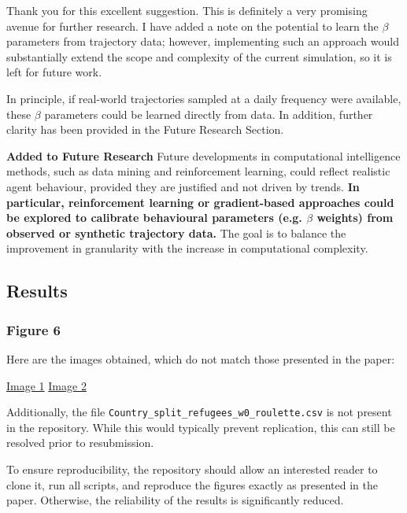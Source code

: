 \documentclass[11pt,a4paper]{article}
\begin{document}
Thank you for this excellent suggestion. This is definitely a very promising avenue for further research. I have added a note on the potential to learn the $\beta$ parameters from trajectory data; however, implementing such an approach would substantially extend the scope and complexity of the current simulation, so it is left for future work.

\vspace{0.5cm}

\begin{updatebox}

In principle, if real-world trajectories sampled at a daily frequency were available, these $\beta$ parameters could be learned directly from data.
In addition, further clarity has been provided in the Future Research Section.

\textbf{Added to Future Research} Future developments in computational intelligence methods, such as data mining and 
reinforcement learning, could reflect 
realistic agent behaviour, provided they are justified and not driven by trends. \textbf{In particular, reinforcement learning or 
gradient-based approaches could be explored to calibrate behavioural parameters (e.g. $\beta$ weights) from observed or 
synthetic trajectory data.} The goal is to balance the improvement 
in granularity with the increase in computational complexity. 
\end{updatebox}

\vspace{0.5cm}

\subsection*{Results}

\subsubsection*{Figure 6}

\begin{reviewbox}

Here are the images obtained, which do not match those presented in the paper:

\href{https://pasteboard.co/LzLPAUiGF1m9.png}{Image 1}
\href{https://pasteboard.co/KUbKqpYE6Ia1.png}{Image 2}

Additionally, the file \texttt{Country\_split\_refugees\_w0\_roulette.csv} is not present in the repository. 
While this would typically prevent replication, this can still be resolved prior to resubmission.

To ensure reproducibility, the repository should allow an interested reader to clone it, run all scripts, and reproduce the figures exactly as presented in the paper. Otherwise, the reliability of the results is significantly reduced.
\end{reviewbox}
\end{document}

